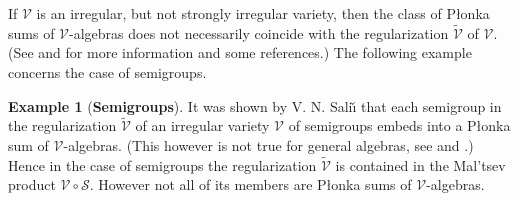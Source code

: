 \documentclass{birkau}
\newcommand{\mcV}{\mathcal{V}}
\newcommand{\mcS}{\mathcal{S}}
\def\wt{\widetilde}
\theoremstyle{plain}
\theoremstyle{definition}
\newtheorem{example}[theorem]{Example}
\numberwithin{equation}{section}
\begin{document}
If $\mcV$ is an irregular, but not strongly irregular variety,
then the class of P\l onka sums of $\mcV$-algebras does not necessarily coincide with the
regularization $\wt{\mcV}$ of $\mcV$. (See \cite[Ch.~4]{RS02} and \cite{PR92} for more
information and some references.) The following example concerns the case of semigroups.


\begin{example}[\textbf{Semigroups}]
  It was shown by V. N. Sali\v{\i} \cite{VS69, VS71} that each semigroup in the
  regularization $\wt{\mcV}$ of an irregular variety $\mcV$ of semigroups embeds into a
  P\l onka sum of $\mcV$-algebras. (This however is not true for general algebras, see
  \cite{GKW86} and \cite{R86}.) Hence in the case of semigroups the
  regularization $\wt{\mcV}$ is contained in the Mal'tsev product $\mcV \circ
  \mcS$. However not all of its members are P\l onka sums of $\mcV$-algebras.
\end{example}
\end{document}
